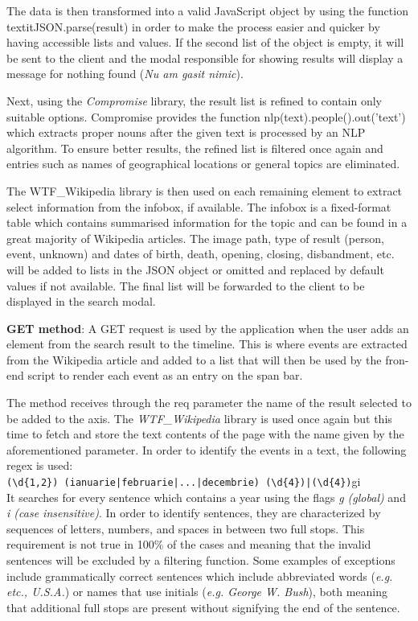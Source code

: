 \documentclass{report}
\begin{document}
The data is then transformed into a valid JavaScript object by using the function textit{JSON.parse(result)} in order to make the process easier and quicker by having accessible lists and values. If the second list of the object is empty, it will be sent to the client and the modal responsible for showing results will display a message for nothing found (\textit{Nu am gasit nimic}).\par

Next, using the \textit{Compromise} library, the result list is refined to contain only suitable options. Compromise provides the function nlp(text).people().out('text') which extracts proper nouns after the given text is processed by an NLP algorithm. To ensure better results, the refined list is filtered once again and entries such as names of geographical locations or general topics are eliminated.\par

The WTF\_Wikipedia library is then used on each remaining element to extract select information from the infobox, if available. The infobox is a fixed-format table which contains summarised information for the topic and can be found in a great majority of Wikipedia articles. The image path, type of result (person, event, unknown) and dates of birth, death, opening, closing, disbandment, etc. will be added to lists in the JSON object or omitted and replaced by default values if not available. The final list will be forwarded to the client to be displayed in the search modal.\par


\textbf{GET method}: A GET request is used by the application when the user adds an element from the search result to the timeline. This is where events are extracted from the Wikipedia article and added to a list that will then be used by the fron-end script to render each event as an entry on the span bar.\par

The method receives through the req parameter the name of the result selected to be added to the axis. The \textit{WTF\_Wikipedia} library is used once again but this time to fetch and store the text contents of the page with the name given by the aforementioned parameter. In order to identify the events in a text, the following regex is used:\\
\verb/(\d{1,2}) (ianuarie|februarie|...|decembrie) (\d{4})|(\d{4})/gi\\
It searches for every sentence which contains a year using the flags \textit{g (global)} and \textit{i (case insensitive)}. In order to identify sentences, they are characterized by sequences of letters, numbers, and spaces in between two full stops. This requirement is not true in 100\% of the cases and meaning that the invalid sentences will be excluded by a filtering function. Some examples of exceptions include grammatically correct sentences which include abbreviated words (\textit{e.g. etc., U.S.A.}) or names that use initials (\textit{e.g. George W. Bush}), both meaning that additional full stops are present without signifying the end of the sentence. \par
\end{document}
